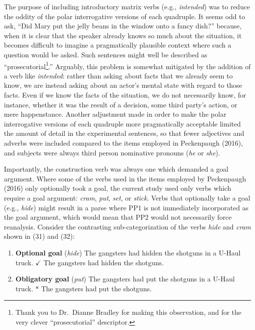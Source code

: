 \documentclass[12pt,oneside]{book}
\let\rmarkdownfootnote\footnote%
\def\footnote{\protect\rmarkdownfootnote}
\begin{document}
The purpose of including introductory matrix verbs (e.g., \emph{intended}) was to reduce the oddity of the polar interrogative versions of each quadruple. It seems odd to ask, ``Did Mary put the jelly beans in the window onto a fancy dish?'' because, when it is clear that the speaker already knows so much about the situation, it becomes difficult to imagine a pragmatically plausible context where such a question would be asked. Such sentences might well be described as ``prosecutorial\footnote{Thank you to Dr.~Dianne Bradley for making this observation, and for the very clever ``prosecutorial'' descriptor.}.'' Arguably, this problem is somewhat mitigated by the addition of a verb like \emph{intended}: rather than asking about facts that we already seem to know, we are instead asking about an actor's mental state with regard to those facts. Even if we know the facts of the situation, we do not necessarily know, for instance, whether it was the result of a decision, some third party's action, or mere happenstance. Another adjustment made in order to make the polar interrogative versions of each quadruple more pragmatically acceptable limited the amount of detail in the experimental sentences, so that fewer adjectives and adverbs were included compared to the items employed in Peckenpaugh (2016), and subjects were always third person nominative pronouns (\emph{he} or \emph{she}).

Importantly, the construction verb was always one which demanded a goal argument. Where some of the verbs used in the items employed by Peckenpaugh (2016) only optionally took a goal, the current study used only verbs which require a goal argument: \emph{cram}, \emph{put}, \emph{set}, or \emph{stick}. Verbs that optionally take a goal (e.g., \emph{hide}) might result in a parse where PP1 is not immediately incorporated as the goal argument, which would mean that PP2 would not necessarily force reanalysis. Consider the contrasting sub-categorization of the verbs \emph{hide} and \emph{cram} shown in (31) and (32):

\begin{enumerate}
\def\labelenumi{(\arabic{enumi})}
\setcounter{enumi}{30}
\item
  \textbf{Optional goal} (\emph{hide}) \linebreak\nopagebreak
  The gangsters had hidden the shotguns in a U-Haul truck. \linebreak\nopagebreak
  \(\checkmark\) The gangsters had hidden the shotguns.
\item
  \textbf{Obligatory goal} (\emph{put}) \linebreak\nopagebreak
  The gangsters had put the shotguns in a U-Haul truck. \linebreak\nopagebreak
  \(*\) The gangsters had put the shotguns.
\end{enumerate}
\end{document}
